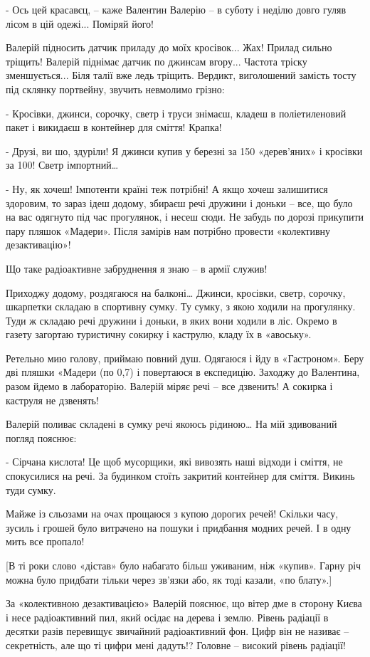 - Ось цей красавєц, – каже Валентин Валерію – в суботу і неділю довго гуляв
лісом в цій одежі... Поміряй його!

Валерій підносить датчик приладу до моїх кросівок... Жах! Прилад сильно тріщить!
Валерій піднімає датчик по джинсам вгору... Частота тріску зменшується... Біля
талії вже ледь тріщить. Вердикт, виголошений замість тосту під склянку
портвейну, звучить невмолимо грізно:

- Кросівки, джинси, сорочку, светр і труси знімаєш, кладеш в поліетиленовий
пакет і викидаєш в контейнер для сміття! Крапка!

- Друзі, ви шо, здуріли! Я джинси купив у березні за 150 «дерев’яних» і
кросівки за 100! Светр імпортний… 

- Ну, як хочеш! Імпотенти країні теж потрібні! А якщо хочеш залишитися
здоровим, то зараз ідеш додому, збираєш речі дружини і доньки – все, що було на
вас одягнуто під час прогулянок, і несеш сюди. Не забудь по дорозі прикупити
пару пляшок «Мадери». Після замірів нам потрібно провести «колективну
дезактивацію»!

Що таке радіоактивне забруднення я знаю – в армії служив!

Приходжу додому, роздягаюся на балконі… Джинси, кросівки, светр, сорочку,
шкарпетки складаю в спортивну сумку. Ту сумку, з якою ходили на прогулянку.
Туди ж складаю речі дружини і доньки, в яких вони ходили в ліс. Окремо в газету
загортаю туристичну сокирку і каструлю, кладу їх в «авоську». 

Ретельно мию голову, приймаю повний душ. Одягаюся і йду в «Гастроном». Беру дві
пляшки «Мадери (по 0,7) і повертаюся в експедицію. Заходжу до Валентина, разом
йдемо в лабораторію. Валерій міряє речі – все дзвенить! А сокирка і каструля не
дзвенять!

Валерій поливає складені в сумку речі якоюсь рідиною… На мій здивований погляд
пояснює:

- Сірчана кислота! Це щоб мусорщики, які вивозять наші відходи і сміття, не
спокусилися на речі. За будинком стоїть закритий контейнер для сміття. Викинь
туди сумку.

Майже із сльозами на очах прощаюся з купою дорогих речей! Скільки часу, зусиль
і грошей було витрачено на пошуки і придбання модних речей. І в одну мить все
пропало! 

[В ті роки слово «дістав» було набагато більш уживаним, ніж «купив». Гарну річ
можна було придбати тільки через зв’язки або, як тоді казали, «по блату».]

За «колективною дезактивацією» Валерій пояснює, що вітер дме в сторону Києва і
несе радіоактивний пил, який осідає на дерева і землю. Рівень радіації в
десятки разів перевищує звичайний радіоактивний фон. Цифр він не називає –
секретність, але що ті цифри мені дадуть!? Головне – високий рівень радіації!

